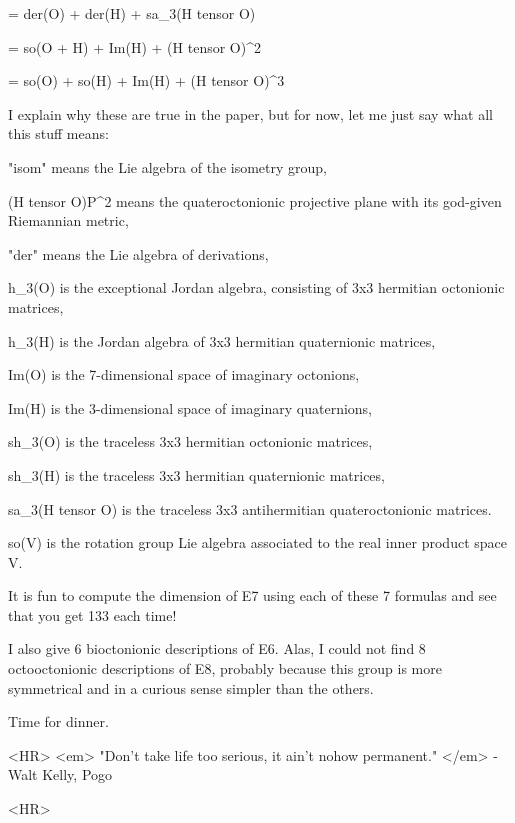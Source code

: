     = der(O) + der(H) + sa_{3}(H tensor O) 

    = so(O + H) + Im(H) + (H tensor O)^{2} 

    = so(O) + so(H) + Im(H) + (H tensor O)^{3}  
$$
    
I explain why these are true in the paper, but for now, let me
just say what all this stuff means:

"isom" means the Lie algebra of the isometry group, 

(H tensor O)P^{2} means the quateroctonionic projective plane
with its god-given Riemannian metric, 

"der" means the Lie algebra of derivations,

h_{3}(O) is the exceptional Jordan algebra, consisting of 3x3 
hermitian octonionic matrices,

h_{3}(H) is the Jordan algebra of 3x3 hermitian quaternionic
matrices,

Im(O) is the 7-dimensional space of imaginary octonions,

Im(H) is the 3-dimensional space of imaginary quaternions,

sh_{3}(O) is the traceless 3x3 hermitian octonionic matrices,

sh_{3}(H) is the traceless 3x3 hermitian quaternionic matrices,

sa_{3}(H tensor O) is the traceless 3x3 antihermitian quateroctonionic
matrices.

so(V) is the rotation group Lie algebra associated to the 
real inner product space V.

It is fun to compute the dimension of E7 using each of these
7 formulas and see that you get 133 each time!  

I also give 6 bioctonionic descriptions of E6.  Alas, I could
not find 8 octooctonionic descriptions of E8, probably because
this group is more symmetrical and in a curious sense simpler 
than the others.

Time for dinner.



 <HR>
<em> "Don't take life too serious, it ain't nohow permanent."
</em> - Walt Kelly, Pogo

<HR>



